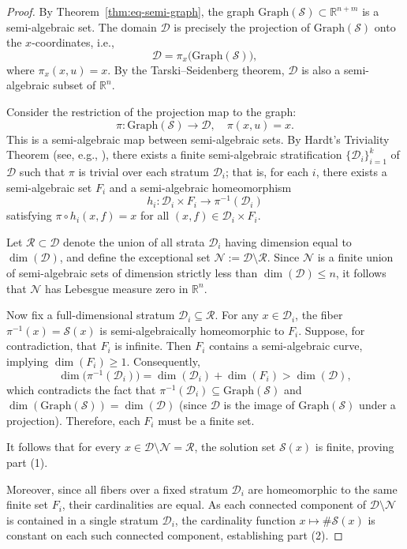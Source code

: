 \documentclass[sn-basic,Numbered]{sn-jnl}
\theoremstyle{thmstyleone}%
\begin{document}
\begin{proof}
By Theorem~\ref{thm:eq-semi-graph}, the graph $\mathrm{Graph}(\mathcal{S}) \subset \mathbb{R}^{n+m}$ is a semi-algebraic set. The domain $\mathcal{D}$ is precisely the projection of $\mathrm{Graph}(\mathcal{S})$ onto the $x$-coordinates, i.e.,
\[
\mathcal{D} = \pi_x\bigl(\mathrm{Graph}(\mathcal{S})\bigr),
\]
where $\pi_x(x,u) = x$. By the Tarski--Seidenberg theorem, $\mathcal{D}$ is also a semi-algebraic subset of $\mathbb{R}^n$.

Consider the restriction of the projection map to the graph:
\[
\pi : \mathrm{Graph}(\mathcal{S}) \to \mathcal{D}, \quad \pi(x, u) = x.
\]
This is a semi-algebraic map between semi-algebraic sets. By Hardt’s Triviality Theorem (see, e.g., \cite{hardt1980semi}), there exists a finite semi-algebraic stratification $\{\mathcal{D}_i\}_{i=1}^k$ of $\mathcal{D}$ such that $\pi$ is trivial over each stratum $\mathcal{D}_i$; that is, for each $i$, there exists a semi-algebraic set $F_i$ and a semi-algebraic homeomorphism
\[
h_i : \mathcal{D}_i \times F_i \to \pi^{-1}(\mathcal{D}_i)
\]
satisfying $\pi \circ h_i(x, f) = x$ for all $(x, f) \in \mathcal{D}_i \times F_i$.

Let $\mathcal{R} \subset \mathcal{D}$ denote the union of all strata $\mathcal{D}_i$ having dimension equal to $\dim(\mathcal{D})$, and define the exceptional set $\mathcal{N} := \mathcal{D} \setminus \mathcal{R}$. Since $\mathcal{N}$ is a finite union of semi-algebraic sets of dimension strictly less than $\dim(\mathcal{D}) \leq n$, it follows that $\mathcal{N}$ has Lebesgue measure zero in $\mathbb{R}^n$.

Now fix a full-dimensional stratum $\mathcal{D}_i \subseteq \mathcal{R}$. For any $x \in \mathcal{D}_i$, the fiber $\pi^{-1}(x) = \mathcal{S}(x)$ is semi-algebraically homeomorphic to $F_i$. Suppose, for contradiction, that $F_i$ is infinite. Then $F_i$ contains a semi-algebraic curve, implying $\dim(F_i) \geq 1$. Consequently,
\[
\dim\bigl(\pi^{-1}(\mathcal{D}_i)\bigr) = \dim(\mathcal{D}_i) + \dim(F_i) > \dim(\mathcal{D}),
\]
which contradicts the fact that $\pi^{-1}(\mathcal{D}_i) \subseteq \mathrm{Graph}(\mathcal{S})$ and $\dim(\mathrm{Graph}(\mathcal{S})) = \dim(\mathcal{D})$ (since $\mathcal{D}$ is the image of $\mathrm{Graph}(\mathcal{S})$ under a projection). Therefore, each $F_i$ must be a finite set.

It follows that for every $x \in \mathcal{D} \setminus \mathcal{N} = \mathcal{R}$, the solution set $\mathcal{S}(x)$ is finite, proving part (1).

Moreover, since all fibers over a fixed stratum $\mathcal{D}_i$ are homeomorphic to the same finite set $F_i$, their cardinalities are equal. As each connected component of $\mathcal{D} \setminus \mathcal{N}$ is contained in a single stratum $\mathcal{D}_i$, the cardinality function $x \mapsto \#\mathcal{S}(x)$ is constant on each such connected component, establishing part (2).
\end{proof}
\end{document}
